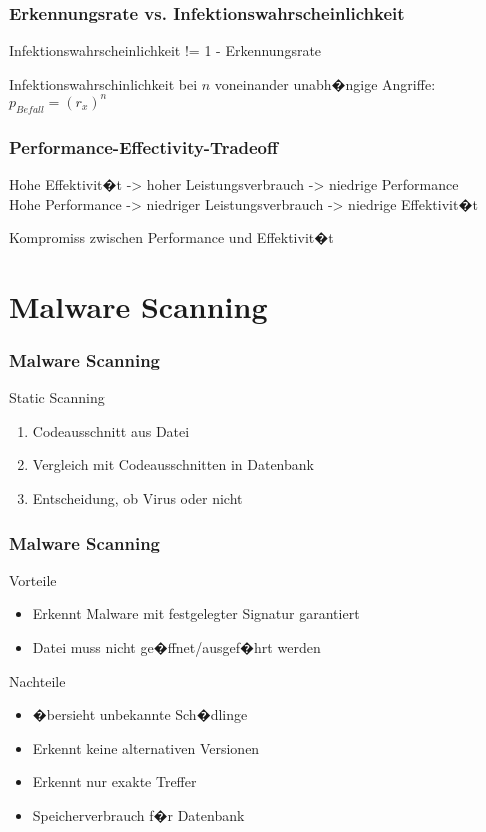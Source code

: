 \documentclass{beamer}
\begin{document}
\begin{frame}
\frametitle{Erkennungsrate vs. Infektionswahrscheinlichkeit}
\begin{block}{}
	Infektionswahrscheinlichkeit != 1 - Erkennungsrate
\end{block}
Infektionswahrschinlichkeit bei $n$ voneinander unabh�ngige Angriffe: \\
\centering
$p_{Befall} = (r_x)^n$




\end{frame}

\begin{frame}
\frametitle{Performance-Effectivity-Tradeoff}
Hohe Effektivit�t -> hoher Leistungsverbrauch -> niedrige Performance \\
Hohe Performance -> niedriger Leistungsverbrauch -> niedrige Effektivit�t

Kompromiss zwischen Performance und Effektivit�t
	
\end{frame}

\section{Malware Scanning}

\begin{frame}
\frametitle{Malware Scanning}
\begin{block}{Static Scanning}
	\begin{enumerate}
		\item Codeausschnitt aus Datei
		\item Vergleich mit Codeausschnitten in Datenbank
		\item Entscheidung, ob Virus oder nicht
	\end{enumerate}

\end{block} 

\end{frame}
\begin{frame}
	\frametitle{Malware Scanning}
	\begin{block}{Vorteile}
		\begin{itemize}
			\item Erkennt Malware mit festgelegter Signatur garantiert
			\item Datei muss nicht ge�ffnet/ausgef�hrt werden
		\end{itemize}
	\end{block} 
	\begin{block}{Nachteile}
		\begin{itemize}
			\item �bersieht unbekannte Sch�dlinge
			\item Erkennt keine alternativen Versionen
			\item Erkennt nur exakte Treffer
			\item Speicherverbrauch f�r Datenbank
		\end{itemize}
	\end{block}
	
\end{frame}
\end{document}

